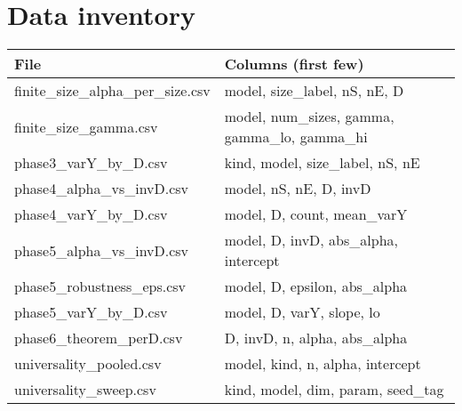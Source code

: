 \section*{Data inventory}
\begin{tabular}{ll}
\toprule
File & Columns (first few)\\\midrule
finite_size_alpha_per_size.csv & model, size\_label, nS, nE, D\\
finite_size_gamma.csv & model, num\_sizes, gamma, gamma\_lo, gamma\_hi\\
phase3_varY_by_D.csv & kind, model, size\_label, nS, nE\\
phase4_alpha_vs_invD.csv & model, nS, nE, D, invD\\
phase4_varY_by_D.csv & model, D, count, mean\_varY\\
phase5_alpha_vs_invD.csv & model, D, invD, abs\_alpha, intercept\\
phase5_robustness_eps.csv & model, D, epsilon, abs\_alpha\\
phase5_varY_by_D.csv & model, D, varY, slope, lo\\
phase6_theorem_perD.csv & D, invD, n, alpha, abs\_alpha\\
universality_pooled.csv & model, kind, n, alpha, intercept\\
universality_sweep.csv & kind, model, dim, param, seed\_tag\\
\bottomrule
\end{tabular}
